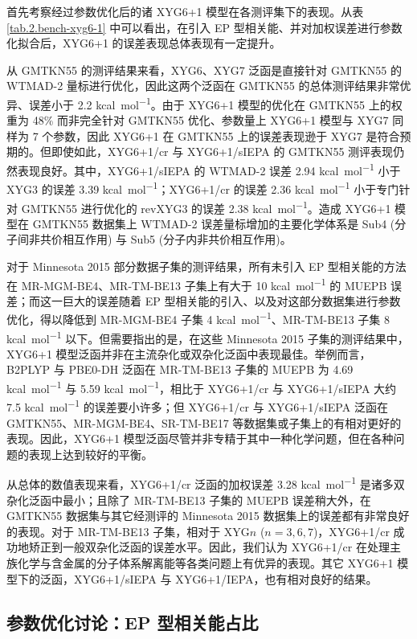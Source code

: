 首先考察经过参数优化后的诸 XYG6+1 模型在各测评集下的表现。从表 \ref{tab.2.bench-xyg6-1} 中可以看出，在引入 EP 型相关能、并对加权误差进行参数化拟合后，XYG6+1 的误差表现总体表现有一定提升。

从 GMTKN55 的测评结果来看，XYG6、XYG7 泛函是直接针对 GMTKN55 的 WTMAD-2 量标进行优化，因此这两个泛函在 GMTKN55 的总体测评结果非常优异、误差小于 2.2 \si{kcal.mol^{-1}}。由于 XYG6+1 模型的优化在 GMTKN55 上的权重为 48\% 而非完全针对 GMTKN55 优化、参数量上 XYG6+1 模型与 XYG7 同样为 7 个参数，因此 XYG6+1 在 GMTKN55 上的误差表现逊于 XYG7 是符合预期的。但即使如此，XYG6+1/cr 与 XYG6+1/sIEPA 的 GMTKN55 测评表现仍然表现良好。其中，XYG6+1/sIEPA 的 WTMAD-2 误差 2.94 \si{kcal.mol^{-1}} 小于 XYG3 的误差 3.39 \si{kcal.mol^{-1}}；XYG6+1/cr 的误差 2.36 \si{kcal.mol^{-1}} 小于专门针对 GMTKN55 进行优化的 revXYG3 的误差 2.38 \si{kcal.mol^{-1}}。造成 XYG6+1 模型在 GMTKN55 数据集上 WTMAD-2 误差量标增加的主要化学体系是 Sub4 (分子间非共价相互作用) 与 Sub5 (分子内非共价相互作用)。

对于 Minnesota 2015 部分数据子集的测评结果，所有未引入 EP 型相关能的方法在 MR-MGM-BE4、MR-TM-BE13 子集上有大于 10 \si{kcal.mol^{-1}} 的 MUEPB 误差；而这一巨大的误差随着 EP 型相关能的引入、以及对这部分数据集进行参数优化，得以降低到 MR-MGM-BE4 子集 4 \si{kcal.mol^{-1}}、MR-TM-BE13 子集 8 \si{kcal.mol^{-1}} 以下。但需要指出的是，在这些 Minnesota 2015 子集的测评结果中，XYG6+1 模型泛函并非在主流杂化或双杂化泛函中表现最佳。举例而言，B2PLYP 与 PBE0-DH 泛函在 MR-TM-BE13 子集的 MUEPB 为 4.69 \si{kcal.mol^{-1}} 与 5.59 \si{kcal.mol^{-1}}，相比于 XYG6+1/cr 与 XYG6+1/sIEPA 大约 7.5 \si{kcal.mol^{-1}} 的误差要小许多；但 XYG6+1/cr 与 XYG6+1/sIEPA 泛函在 GMTKN55、MR-MGM-BE4、SR-TM-BE17 等数据集或子集上的有相对更好的表现。因此，XYG6+1 模型泛函尽管并非专精于其中一种化学问题，但在各种问题的表现上达到较好的平衡。

从总体的数值表现来看，XYG6+1/cr 泛函的加权误差 3.28 \si{kcal.mol^{-1}} 是诸多双杂化泛函中最小；且除了 MR-TM-BE13 子集的 MUEPB 误差稍大外，在 GMTKN55 数据集与其它经测评的 Minnesota 2015 数据集上的误差都有非常良好的表现。对于 MR-TM-BE13 子集，相对于 XYG$n$ ($n=3,6,7$)，XYG6+1/cr 成功地矫正到一般双杂化泛函的误差水平。因此，我们认为 XYG6+1/cr 在处理主族化学与含金属的分子体系解离能等各类问题上有优异的表现。其它 XYG6+1 模型下的泛函，XYG6+1/sIEPA 与 XYG6+1/IEPA，也有相对良好的结果。

\subsection{参数优化讨论：EP 型相关能占比}
\label{sec.2.proportion-iepa-like}

